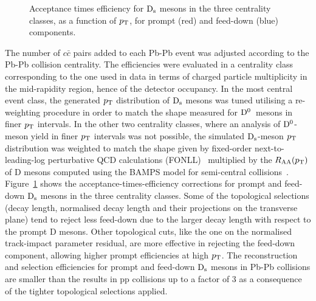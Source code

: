 \begin{figure}[!b]
\caption{Acceptance times efficiency for ${\rm D_s}$ mesons in the three centrality classes, as a function of $p_{\rm T}$, for prompt (red) and feed-down (blue) components.}
\label{fig:DsAccEff}
\end{figure}
The number of $c\bar{c}$ pairs added to each Pb-Pb 
event was adjusted according to the Pb-Pb collision centrality. 
The efficiencies were evaluated in a centrality class 
corresponding to the one used in 
data in terms of charged particle 
multiplicity in the mid-rapidity region, hence of the detector occupancy.
In the most central event class, the generated $p_{\rm T}$ distribution 
of ${\rm D_s}$ mesons was tuned utilising a re-weighting procedure in order to match the 
shape measured for \mbox{$\rm D^0$ mesons} in finer 
$p_{\rm T}$ intervals. In the other two centrality classes, 
where an analysis of ${\rm D^0}$-meson yield in finer $p_{\rm T}$ intervals was not possible, 
the simulated ${\rm D_s}$-meson $p_{\rm T}$ distribution was weighted 
to match the shape given by fixed-order next-to-leading-log 
perturbative QCD calculations (FONLL)~\cite{Cacciari:1998it,Cacciari:2001td} 
multiplied by the $R_{\rm AA}(p_{\rm T})$ of D mesons computed 
using the BAMPS model for semi-central 
collisions~\cite{Uphoff:2011ad,Fochler:2011en,Uphoff:2012gb}.
Figure~\ref{fig:DsAccEff} shows the acceptance-times-efficiency 
corrections for prompt and feed-down ${\rm D_s}$ mesons in the three
centrality classes.
Some of the topological selections (decay length, normalised decay length and their 
projections on the transverse plane) tend to reject 
less feed-down due to the larger 
decay length with respect to the prompt D mesons. 
Other topological cuts, like the one on the normalised 
track-impact parameter residual, are more effective
in rejecting the feed-down component, allowing higher 
prompt efficiencies at high $p_{\rm T}$.
The reconstruction and selection efficiencies for prompt and feed-down
${\rm D_s}$ mesons in Pb-Pb collisions are smaller than the results in pp 
collisions up to a factor of 3 as a consequence of
the tighter topological selections applied. \\

